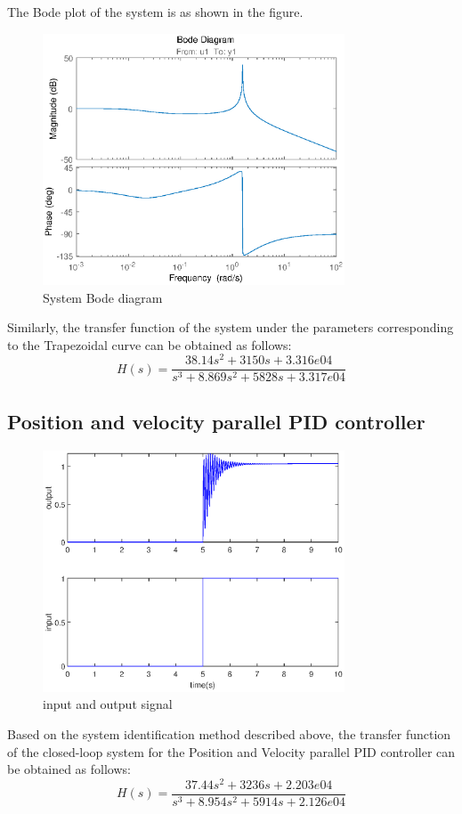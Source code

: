 \documentclass[11pt,a4paper]{article}%
\begin{document}
The Bode plot of the system is as shown in the figure.
\begin{figure}[H]
    \centering
    \includegraphics[width=0.8\textwidth]{bode}
    \caption{System Bode diagram}
    \label{bode}
\end{figure}
Similarly, the transfer function of the system under the parameters corresponding to the Trapezoidal curve can be obtained as follows:
\begin{equation}
    H(s)=\frac{38.14s^2 + 3150s + 3.316e04}{s^3 + 8.869s^2 + 5828s + 3.317e04}
\end{equation}
\subsection{Position and velocity parallel PID controller}
\begin{figure}[H]
    \centering
    \includegraphics[width=0.8\textwidth]{abc}
    \caption{input and output signal}
    \label{inoutput}
\end{figure}
Based on the system identification method described above, the transfer function of the closed-loop system for the Position and Velocity parallel PID controller can be obtained as follows:
\begin{equation}
    H(s)=\frac{37.44s^2 + 3236s + 2.203e04}{s^3 + 8.954s^2 + 5914s + 2.126e04}
\end{equation}
\end{document}
